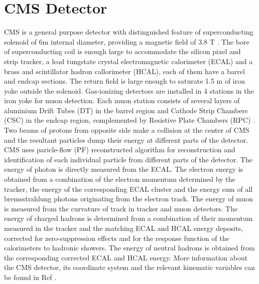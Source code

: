 \documentclass{cmspaper}
\begin{document}
\section{CMS Detector}
CMS is a general purpose detector with distinguished feature of superconducting solenoid of 6m internal diameter, providing a magnetic field of 3.8 T \cite{magnet}. The bore of superconducting coil is enough large to accommodate the silicon pixel and strip tracker, a lead tungstate crystal electromagnetic calorimeter (ECAL) and a brass and scintillator hadron callorimeter (HCAL), each of them have a barrel and endcap sections. The return field is large enough to saturate 1.5 m of iron yoke outside the solenoid. Gas-ionizing detectors are installed in 4 stations in the iron yoke for muon detection. Each muon station consists of several layers of aluminium Drift Tubes (DT) in the barrel region and Cathode Strip Chambers (CSC) in the endcap region, complemented by Resistive Plate Chambers (RPC) \cite{rpc}.\\
Two beams of protons from opposite side make a collision at the center of CMS and the resultant particles dump their energy at different parts of the detector. CMS uses paricle-flow (PF) reconstructed algorithm for reconstruction and identification of each individual particle from different parts of the detector. The energy of photon is directly measured from the ECAL. The electron energy is obtained from a combination of the electron momentum determined by the tracker, the energy of the corresponding ECAL cluster and the energy sum of all bremsstrahlung photons originating from the electron track. The energy of muon is measured from the curvature of track in tracker and muon detectors. The energy of charged hadrons is determined from a combination of their momentum measured in the tracker and the matching ECAL and HCAL energy deposits, corrected for zero-suppression effects and for the response function of the calorimeters to hadronic showers. The energy of neutral hadrons is obtained from the corresponding corrected ECAL and HCAL energy.   
More information about the CMS detector, its coordinate system and the relevant kinematic variables can be found in Ref \cite{cmsdetector}. 
\end{document}
